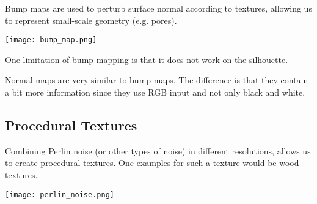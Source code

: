 Bump maps are used to perturb surface normal according to textures, allowing us to represent small-scale geometry (e.g. pores).
\begin{center}
	\texttt{[image: bump\_map.png]}
\end{center}

One limitation of bump mapping is that it does not work on the silhouette. \medskip

Normal maps are very similar to bump maps. The difference is that they contain a bit more information since they use RGB input and not only black and white.


\subsection{Procedural Textures}

Combining Perlin noise (or other types of noise) in different resolutions, allows us to create procedural textures. One examples for such a texture would be wood textures.

\begin{center}
	\texttt{[image: perlin\_noise.png]}
\end{center}
